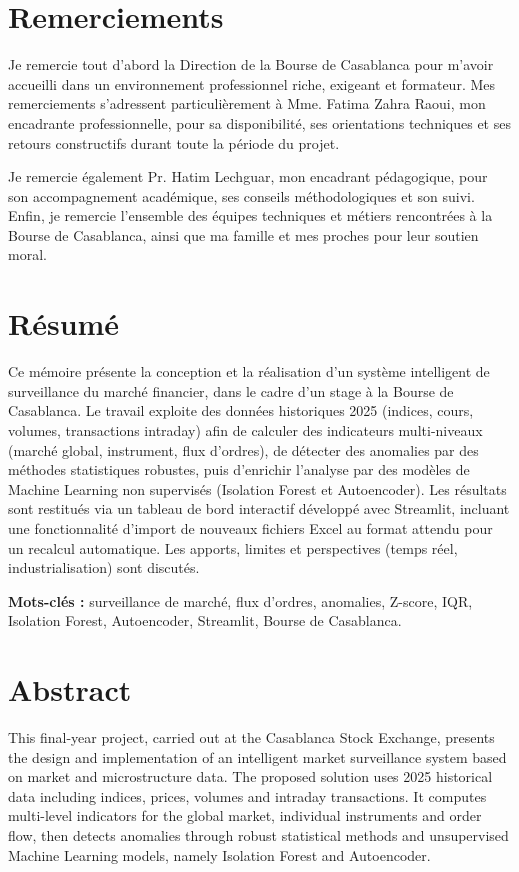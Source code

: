 \documentclass[a4paper,12pt,twoside,openright]{report}
\begin{document}
\chapter*{Remerciements}
Je remercie tout d'abord la Direction de la Bourse de Casablanca pour m'avoir accueilli dans un environnement professionnel riche, exigeant et formateur. Mes remerciements s'adressent particulièrement à Mme. Fatima Zahra Raoui, mon encadrante professionnelle, pour sa disponibilité, ses orientations techniques et ses retours constructifs durant toute la période du projet.

Je remercie également Pr. Hatim Lechguar, mon encadrant pédagogique, pour son accompagnement académique, ses conseils méthodologiques et son suivi. Enfin, je remercie l'ensemble des équipes techniques et métiers rencontrées à la Bourse de Casablanca, ainsi que ma famille et mes proches pour leur soutien moral.

\chapter*{Résumé}
Ce mémoire présente la conception et la réalisation d'un système intelligent de surveillance du marché financier, dans le cadre d'un stage à la Bourse de Casablanca. Le travail exploite des données historiques 2025 (indices, cours, volumes, transactions intraday) afin de calculer des indicateurs multi-niveaux (marché global, instrument, flux d'ordres), de détecter des anomalies par des méthodes statistiques robustes, puis d'enrichir l'analyse par des modèles de Machine Learning non supervisés (Isolation Forest et Autoencoder). Les résultats sont restitués via un tableau de bord interactif développé avec Streamlit, incluant une fonctionnalité d'import de nouveaux fichiers Excel au format attendu pour un recalcul automatique. Les apports, limites et perspectives (temps réel, industrialisation) sont discutés.

\vspace{0.8cm}
\noindent\textbf{Mots-clés :} surveillance de marché, flux d'ordres, anomalies, Z-score, IQR, Isolation Forest, Autoencoder, Streamlit, Bourse de Casablanca.

\chapter*{Abstract}
This final-year project, carried out at the Casablanca Stock Exchange, presents the design and implementation of an intelligent market surveillance system based on market and microstructure data. The proposed solution uses 2025 historical data including indices, prices, volumes and intraday transactions. It computes multi-level indicators for the global market, individual instruments and order flow, then detects anomalies through robust statistical methods and unsupervised Machine Learning models, namely Isolation Forest and Autoencoder.
\end{document}
